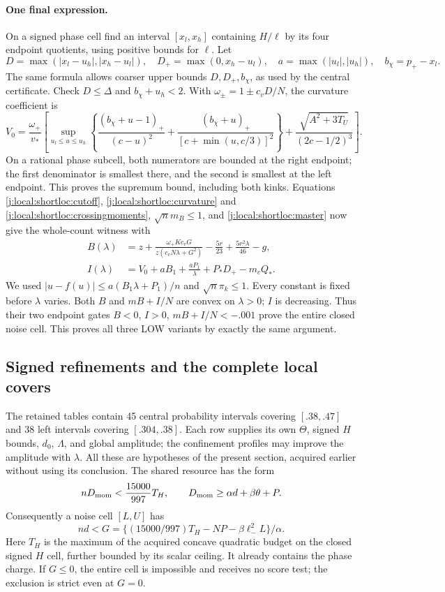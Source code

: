 \paragraph{One final expression.}
On a signed phase cell find an interval $[x_l,x_h]$ containing $H/\ell$
by its four endpoint quotients, using positive bounds for $\ell$.
Let
\[
 D=\max(|x_l-u_h|,|x_h-u_l|),\quad
 D_+=\max(0,x_h-u_l),\quad a=\max(|u_l|,|u_h|),\quad b_\chi=p_+-x_l.
\]
The same formula allows coarser upper bounds $D,D_+,b_\chi$, as used by
the central certificate. Check $D\le\Delta$ and $b_\chi+u_h<2$.
With $\omega_\pm=1\pm c_vD/N$, the curvature coefficient is
\begin{equation}\label{j:local:shortloc:V}
 V_0=\frac{\omega_+}{v_*}\left[
 \sup_{u_l\le u\le u_h}\left\{
 \frac{(b_\chi+u-1)_+}{(c-u)^2}
 +\frac{(b_\chi+u)_+}{[c+\min(u,c/3)]^2}\right\}
 +\frac{\sqrt{A^2+3T_U}}{(2c-1/2)^3}\right].
\end{equation}
On a rational phase subcell, both numerators are bounded at the right
endpoint; the first denominator is smallest there, and the second is
smallest at the left endpoint. This proves the supremum bound, including
both kinks. Equations \eqref{j:local:shortloc:cutoff}, \eqref{j:local:shortloc:curvature} and
\eqref{j:local:shortloc:crossingmoments},
$\sqrt n m_B\le1$, and \eqref{j:local:shortloc:master} now give the whole-count
witness with
\begin{align}\label{j:local:shortloc:BI}
 B(\lambda)&=z+\frac{\omega_+Kc_vG}{z(c_vN\lambda+G^2)}
                      -\frac{5r}{23}+\frac{5r^2\lambda}{46}-g,\\
 I(\lambda)&=V_0+aB_1+\frac{aP_1}{\lambda}+P_*D_+-m_cQ_*.
 \nonumber
\end{align}
We used $|u-f(u)|\le a(B_1\lambda+P_1)/n$ and $\sqrt n\pi_k\le1$.
Every constant is fixed before $\lambda$ varies. Both $B$ and
$mB+I/N$ are convex on $\lambda>0$; $I$ is decreasing. Thus their two
endpoint gates $B<0$, $I>0$, $mB+I/N<-.001$ prove the entire closed noise
cell. This proves all three LOW variants by exactly the same argument.

\subsection{Signed refinements and the complete local covers}

The retained tables contain 45 central probability intervals covering
$[.38,.47]$ and 38 left intervals covering $[.304,.38]$. Each row supplies
its own $\Theta$, signed $H$ bounds, $d_0$, $\Lambda$, and global amplitude;
the confinement profiles may improve the amplitude with $\lambda$.
All these are hypotheses of the present section, acquired earlier without
using its conclusion. The shared resource has the form
\[
 nD_{\rm mom}<\frac{15000}{997}T_H,\qquad
 D_{\rm mom}\ge\alpha d+\beta\theta+P.
\]
Consequently a noise cell $[L,U]$ has
\[
 nd<G=\{(15000/997)T_H-NP-\beta\ell_-^2L\}/\alpha.
\]
Here $T_H$ is the maximum of the acquired concave quadratic budget on the
closed signed $H$ cell, further bounded by its scalar ceiling. It already
contains the phase charge. If $G\le0$, the entire cell is impossible and
receives no score test; the exclusion is strict even at $G=0$.

